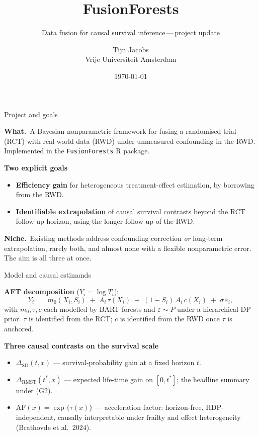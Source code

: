 \documentclass[10pt,aspectratio=169]{beamer}
\title{FusionForests}
\subtitle{Data fusion for causal survival inference\,---\,project update}
\author{Tijn Jacobs \\ \small Vrije Universiteit Amsterdam}
\date{\today}
\newcommand{\X}{X}
\newcommand{\A}{A}
\newcommand{\Sx}{S}
\newcommand{\CATE}{\tau}
\newcommand{\cf}{c}
\newcommand{\mzero}{m_{0}}
\newcommand{\SD}{\mathrm{SD}}
\newcommand{\RMST}{\mathrm{RMST}}
\begin{document}
\maketitle

\begin{frame}{Project and goals}

\textbf{What.}\ A Bayesian nonparametric framework for fusing a
randomised trial (RCT) with real-world data (RWD) under
unmeasured confounding in the RWD. Implemented in the
\texttt{FusionForests} R package.

\medskip
\textbf{Two explicit goals}
\begin{itemize}
  \item[\textbf{(G1)}] \textbf{Efficiency gain} for heterogeneous
        treatment-effect estimation, by borrowing from the RWD.
  \item[\textbf{(G2)}] \textbf{Identifiable extrapolation} of causal
        survival contrasts beyond the RCT follow-up horizon, using
        the longer follow-up of the RWD.
\end{itemize}

\medskip
\textbf{Niche.}\ Existing methods address confounding correction
\emph{or} long-term extrapolation, rarely both, and almost none with a
flexible nonparametric error. The aim is all three at once.

\end{frame}

\begin{frame}{Model and causal estimands}

\textbf{AFT decomposition} ($Y_i = \log T_i$):
\[
  Y_i \;=\; \mzero(\X_i, \Sx_i)
         \;+\; \A_i\,\CATE(\X_i)
         \;+\; (1-\Sx_i)\,\A_i\,\cf(\X_i)
         \;+\; \sigma\,\varepsilon_i,
\]
with $\mzero, \CATE, \cf$ each modelled by BART forests and
$\varepsilon \sim P$ under a hierarchical-DP prior. $\CATE$ is
identified from the RCT; $\cf$ is identified from the RWD once $\CATE$
is anchored.

\bigskip
\textbf{Three causal contrasts on the survival scale}
\begin{itemize}
  \item $\Delta_{\SD}(t, x)$ --- survival-probability gain at a fixed
        horizon $t$.
  \item $\Delta_{\RMST}(t^{*}, x)$ --- expected life-time gain on
        $[0, t^{*}]$; the headline summary under (G2).
  \item \alert{$\mathrm{AF}(x) = \exp\{\CATE(x)\}$} --- acceleration
        factor: horizon-free, HDP-independent, causally interpretable
        under frailty and effect heterogeneity
        (Brathovde et al.\ 2024).
\end{itemize}

\end{frame}
\end{document}
